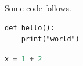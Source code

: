 Some code follows.

\begin{verbatim}
def hello():
    print("world")
\end{verbatim}

\begin{lstlisting}[language=Python]
x = 1 + 2
\end{lstlisting}
